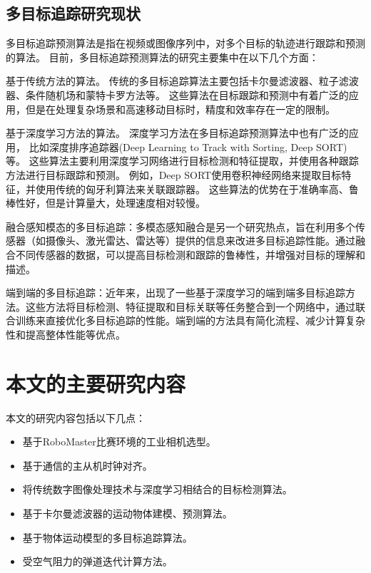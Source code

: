 \subsection{多目标追踪研究现状}
多目标追踪预测算法是指在视频或图像序列中，对多个目标的轨迹进行跟踪和预测的算法。
目前，多目标追踪预测算法的研究主要集中在以下几个方面：
\par
基于传统方法的算法。
传统的多目标追踪算法主要包括卡尔曼滤波器、粒子滤波器、条件随机场和蒙特卡罗方法等。
这些算法在目标跟踪和预测中有着广泛的应用，但是在处理复杂场景和高速移动目标时，精度和效率存在一定的限制。
\par
基于深度学习方法的算法。
深度学习方法在多目标追踪预测算法中也有广泛的应用\cite{xu2019deep}，
比如深度排序追踪器(Deep Learning to Track with Sorting, Deep SORT)\cite{wojke2017simple}等。
这些算法主要利用深度学习网络进行目标检测和特征提取，并使用各种跟踪方法进行目标跟踪和预测。
例如，Deep SORT使用卷积神经网络来提取目标特征，并使用传统的匈牙利算法来关联跟踪器。
这些算法的优势在于准确率高、鲁棒性好，但是计算量大，处理速度相对较慢。
\par
融合感知模态的多目标追踪：多模态感知融合是另一个研究热点，旨在利用多个传感器（如摄像头、激光雷达、雷达等）提供的信息来改进多目标追踪性能。通过融合不同传感器的数据，可以提高目标检测和跟踪的鲁棒性，并增强对目标的理解和描述。
\par
端到端的多目标追踪：近年来，出现了一些基于深度学习的端到端多目标追踪方法。这些方法将目标检测、特征提取和目标关联等任务整合到一个网络中，通过联合训练来直接优化多目标追踪的性能。端到端的方法具有简化流程、减少计算复杂性和提高整体性能等优点。

\section{本文的主要研究内容}
本文的研究内容包括以下几点：
\begin{itemize}[itemindent=2em]
    \item 基于RoboMaster比赛环境的工业相机选型。
    \item 基于通信的主从机时钟对齐。
    \item 将传统数字图像处理技术与深度学习相结合的目标检测算法。
    \item 基于卡尔曼滤波器的运动物体建模、预测算法。
    \item 基于物体运动模型的多目标追踪算法。
    \item 受空气阻力的弹道迭代计算方法。
\end{itemize}





